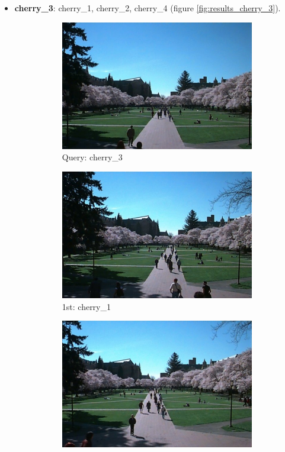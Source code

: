 \begin{itemize}
\item \textbf{cherry\_3}: cherry\_1, cherry\_2, cherry\_4 (figure \ref{fig:results_cherry_3}).
\begin{figure}[H]
	\centering
	\begin{subfigure}{0.25\textwidth}
	  \centering
	  \includegraphics[width=0.9\linewidth]{../input/cherry_3.jpg}
	  \caption{Query: cherry\_3}
	\end{subfigure}%
	\begin{subfigure}{0.25\textwidth}
	  \centering
	  \includegraphics[width=0.9\linewidth]{../input/cherry_1.jpg}
	  \caption{1st: cherry\_1}
	\end{subfigure}%
	\begin{subfigure}{0.25\textwidth}
        \centering
        \includegraphics[width=0.9\linewidth]{../input/cherry_2.jpg}

\end{subfigure}
\end{figure}
\end{itemize}
